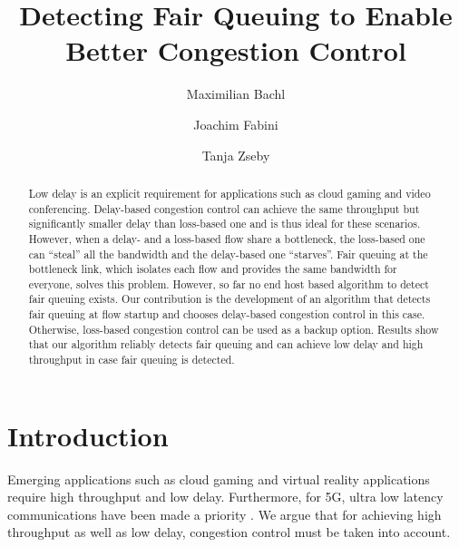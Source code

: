 \documentclass[runningheads]{llncs}
\begin{document}
%
\title{Detecting Fair Queuing to Enable Better Congestion Control}
%
%
\author{Maximilian Bachl \and
Joachim Fabini \and
Tanja Zseby}
%
%
%
\maketitle              %
%
\begin{abstract}
Low delay is an explicit requirement for applications such as cloud gaming and video conferencing. Delay-based congestion control can achieve the same throughput but significantly smaller delay than loss-based one and is thus ideal for these scenarios. However, when a delay- and a loss-based flow share a bottleneck, the loss-based one can ``steal'' all the bandwidth and the delay-based one ``starves''. Fair queuing at the bottleneck link, which isolates each flow and provides the same bandwidth for everyone, solves this problem. However, so far no end host based algorithm to detect fair queuing exists. Our contribution is the development of an algorithm that detects fair queuing at flow startup and chooses delay-based congestion control in this case. Otherwise, loss-based congestion control can be used as a backup option. Results show that our algorithm reliably detects fair queuing and can achieve low delay and high throughput in case fair queuing is detected. 

\end{abstract}
%
%
%
\section{Introduction}
\label{sec:introduction}

Emerging applications such as cloud gaming \cite{jarschel_evaluation_2011} and virtual reality \cite{elbamby_toward_2018} applications require high throughput and low delay. Furthermore, for 5G, ultra low latency communications have been made a priority \cite{li_5g_2018}. We argue that for achieving high throughput as well as low delay, congestion control must be taken into account. 
\end{document}
